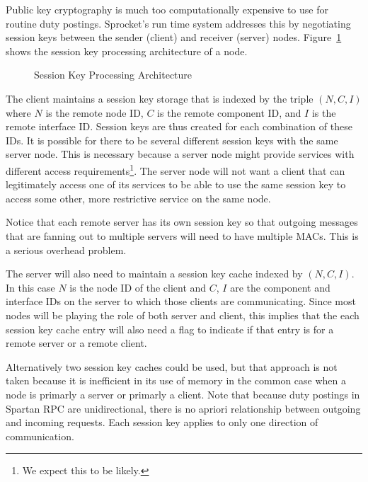 Public key cryptography is much too computationally expensive to use for routine duty postings.
Sprocket's run time system addresses this by negotiating session keys between the sender
(client) and receiver (server) nodes. Figure~\ref{fig:sessionkey-daemon} shows the session key
processing architecture of a node.

\begin{figure}[htbp]
  
  \centerline{\box\graph}
  \caption{Session Key Processing Architecture}
  \label{fig:sessionkey-daemon}
\end{figure}

The client maintains a session key storage that is indexed by the triple $(N, C, I)$ where $N$ is
the remote node ID, $C$ is the remote component ID, and $I$ is the remote interface ID. Session
keys are thus created for each combination of these IDs. It is possible for there to be several
different session keys with the same server node. This is necessary because a server node might
provide services with different access requirements\footnote{We expect this to be likely.}. The
server node will not want a client that can legitimately access one of its services to be able
to use the same session key to access some other, more restrictive service on the same node.

Notice that each remote server has its own session key so that outgoing messages that are
fanning out to multiple servers will need to have multiple MACs. This is a serious overhead
problem. 

The server will also need to maintain a session key cache indexed by $(N, C, I)$. In this case
$N$ is the node ID of the client and $C$, $I$ are the component and interface IDs on the server
to which those clients are communicating. Since most nodes will be playing the role of both
server and client, this implies that the each session key cache entry will also need a flag to
indicate if that entry is for a remote server or a remote client.

Alternatively two session key caches could be used, but that approach is not taken because it is
inefficient in its use of memory in the common case when a node is primarly a server or primarly
a client. Note that because duty postings in Spartan RPC are unidirectional, there is no apriori
relationship between outgoing and incoming requests. Each session key applies to only one
direction of communication.

